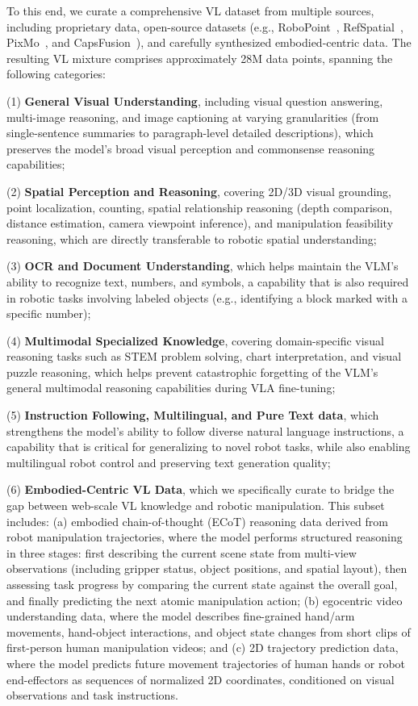 To this end, we curate a comprehensive VL dataset from multiple sources, including proprietary data, open-source datasets (e.g., RoboPoint~\citep{yuan2024robopoint}, RefSpatial~\citep{zhou2025roborefer}, PixMo~\citep{deitke2025pixmo}, and CapsFusion~\citep{yu2024capsfusion}), and carefully
synthesized embodied-centric data. The resulting VL mixture comprises approximately 28M data points, spanning the following categories:

(1) \textbf{General Visual Understanding}, including visual question answering, multi-image reasoning, and image captioning at varying granularities (from single-sentence summaries to paragraph-level detailed descriptions), which preserves the model's broad visual perception and commonsense reasoning capabilities;

(2) \textbf{Spatial Perception and Reasoning}, covering 2D/3D visual grounding, point localization, counting, spatial relationship reasoning (depth comparison, distance estimation, camera viewpoint inference), and manipulation feasibility reasoning, which are directly transferable to robotic spatial understanding;

(3) \textbf{OCR and Document Understanding}, which helps maintain the VLM's ability to recognize text, numbers, and symbols, a capability that is also required in robotic tasks involving labeled objects (e.g., identifying a block marked with a specific number);

(4) \textbf{Multimodal Specialized Knowledge}, covering domain-specific visual reasoning tasks such as STEM problem solving, chart interpretation, and visual puzzle reasoning, which helps prevent catastrophic forgetting of the VLM's general multimodal reasoning capabilities during VLA fine-tuning;

(5) \textbf{Instruction Following, Multilingual, and Pure Text data}, which strengthens the model's ability to follow diverse natural language instructions, a capability that is critical for generalizing to novel robot tasks, while also enabling multilingual robot control and preserving text generation quality;

(6) \textbf{Embodied-Centric VL Data}, which we specifically curate to bridge the gap between web-scale VL knowledge and robotic manipulation. This subset includes:   (a) embodied chain-of-thought (ECoT) reasoning data derived from robot manipulation trajectories, where the model performs structured reasoning in three stages: first describing the current scene state from multi-view observations (including gripper status, object positions, and spatial layout), then assessing task progress by comparing the current state against the overall goal, and finally predicting the next atomic manipulation action; (b) egocentric video understanding data, where the model describes fine-grained hand/arm movements, hand-object interactions, and object state changes from short clips of first-person human manipulation videos; and (c) 2D trajectory prediction data, where the model predicts future movement trajectories of human hands or robot end-effectors as sequences of normalized 2D coordinates, conditioned on visual observations and task instructions.

